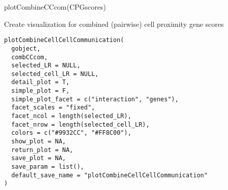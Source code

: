 \documentclass[a4paper]{book}
\begin{document}
%
\begin{Examples}
\begin{ExampleCode}
    plotCombineCCcom(CPGscores)
\end{ExampleCode}
\end{Examples}
%
\begin{Description}\relax
Create visualization for combined (pairwise) cell proximity gene scores
\end{Description}
%
\begin{Usage}
\begin{verbatim}
plotCombineCellCellCommunication(
  gobject,
  combCCcom,
  selected_LR = NULL,
  selected_cell_LR = NULL,
  detail_plot = T,
  simple_plot = F,
  simple_plot_facet = c("interaction", "genes"),
  facet_scales = "fixed",
  facet_ncol = length(selected_LR),
  facet_nrow = length(selected_cell_LR),
  colors = c("#9932CC", "#FF8C00"),
  show_plot = NA,
  return_plot = NA,
  save_plot = NA,
  save_param = list(),
  default_save_name = "plotCombineCellCellCommunication"
)
\end{verbatim}
\end{Usage}
%
\end{document}
